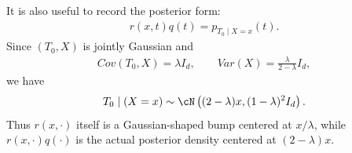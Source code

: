 It is also useful to record the posterior form:
\begin{align}
    r(x,t)q(t)
    =
    p_{T_0\mid X=x}(t).
\end{align}
Since $(T_0,X)$ is jointly Gaussian and
\begin{align}
    Cov(T_0,X)=\lambda I_d,
    \qquad
    Var(X)=\frac{\lambda}{2-\lambda}I_d,
\end{align}
we have
\begin{align}
    T_0\mid (X=x)
    \sim
    \cN\left(
    (2-\lambda)x,
    (1-\lambda)^2 I_d
    \right).
    \label{eq:gaussian_posterior_T_given_X}
\end{align}
Thus $r(x,\cdot)$ itself is a Gaussian-shaped bump centered at $x/\lambda$, while
$r(x,\cdot)q(\cdot)$ is the actual posterior density centered at $(2-\lambda)x$.